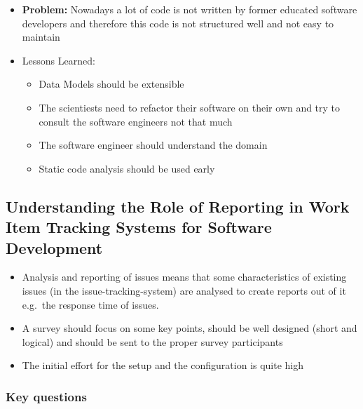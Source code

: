 \begin{itemize}
\tightlist
\item
  \textbf{Problem:} Nowadays a lot of code is not written by former
  educated software developers and therefore this code is not structured
  well and not easy to maintain
\item
  Lessons Learned:

  \begin{itemize}
  \tightlist
  \item
    Data Models should be extensible
  \item
    The scientiests need to refactor their software on their own and try
    to consult the software engineers not that much
  \item
    The software engineer should understand the domain
  \item
    Static code analysis should be used early
  \end{itemize}
\end{itemize}

\hypertarget{understanding-the-role-of-reporting-in-work-item-tracking-systems-for-software-development}{%
\subsection{Understanding the Role of Reporting in Work Item Tracking
Systems for Software
Development}\label{understanding-the-role-of-reporting-in-work-item-tracking-systems-for-software-development}}

\begin{itemize}
\tightlist
\item
  Analysis and reporting of issues means that some characteristics of
  existing issues (in the issue-tracking-system) are analysed to create
  reports out of it e.g.~the response time of issues.
\item
  A survey should focus on some key points, should be well designed
  (short and logical) and should be sent to the proper survey
  participants
\item
  The initial effort for the setup and the configuration is quite high
\end{itemize}

\hypertarget{key-questions}{%
\subsubsection{Key questions}\label{key-questions}}

